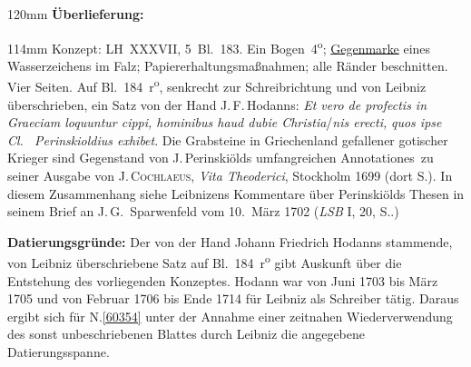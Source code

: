 \begin{ledgroupsized}[r]{120mm}
\footnotesize
\pstart
\noindent\textbf{Überlieferung:}
\pend
\end{ledgroupsized}
\begin{ledgroupsized}[r]{114mm}
\footnotesize
\pstart \parindent -6mm
%
Konzept:
LH~XXXVII, 5~Bl.~183. 
Ein Bogen~4\textsuperscript{o};
\href{\Scan{LH_37_05_184wz}}%
{Gegenmarke}
eines Wasserzeichens im Falz; %
Papiererhaltungsmaßnahmen;
alle Ränder beschnitten.
Vier Seiten.
Auf Bl.~184~r\textsuperscript{o}, senkrecht zur Schreibrichtung und von Leibniz überschrieben, ein Satz von der Hand 
J.\,F.\,Hodanns:
\textit{Et vero de profectis in Graeciam %
loquuntur cippi, hominibus haud dubie Christia}\lbrack/\rbrack\textit{nis erecti,}
\textit{quos ipse
Cl.~%
Perinskioldius exhibet}.
Die Grabsteine in Griechenland gefallener gotischer Krieger sind Gegenstand von
%
J.\,Perinskiölds 
umfangreichen \glqq Annotationes\grqq\ zu seiner Ausgabe von
%
\textsc{J.\,Cochlaeus}, 
\cite{02052}\textit{Vita Theoderici}, Stockholm 1699 (dort S.).
In diesem Zusammenhang siehe Leibnizens Kommentare über
%
Perinskiölds Thesen in seinem
\cite{02051}Brief an 
%
J.\,G.~Sparwenfeld
vom 10.\ März 1702 (\textit{LSB} I, 20, S..)
\pend
\end{ledgroupsized}
\vspace{5mm}
\begin{ledgroup}
\footnotesize
\pstart
\noindent%
\textbf{Datierungsgründe:}
Der von der Hand 
Johann Friedrich Hodanns 
stammende, von Leibniz überschriebene Satz auf Bl.~184~r\textsuperscript{o} 
gibt Auskunft über die Entstehung des vorliegenden Konzeptes.
Hodann war
von Juni 1703 bis März 1705 und  von Februar 1706 bis Ende 1714
für Leibniz als Schreiber tätig.
Daraus ergibt sich für N.\;\ref{60354}
unter der Annahme einer zeitnahen Wiederverwendung des sonst unbeschriebenen Blattes durch Leibniz
die angegebene Datierungsspanne.
\pend 
\end{ledgroup}
